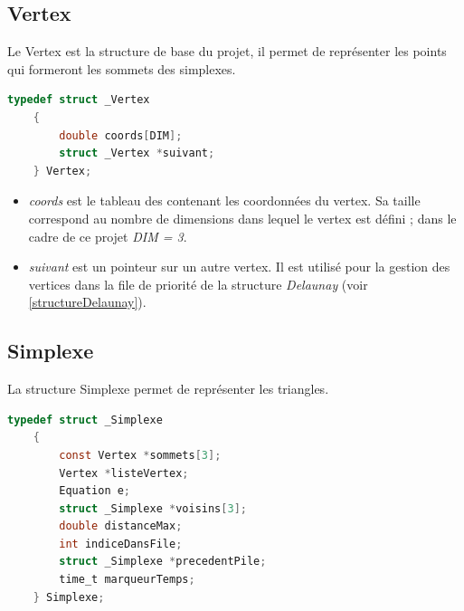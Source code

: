 \documentclass{article}
\begin{document}
    \subsection{Vertex}
    
        Le Vertex est la structure de base du projet, il permet de représenter les points qui formeront les sommets des simplexes.
    
    \begin{lstlisting}[caption={la structure Vertex},language=C,label=structvertex]
    typedef struct _Vertex
    {
        double coords[DIM]; 
        struct _Vertex *suivant;
    } Vertex;
    \end{lstlisting}
    
    \begin{itemize}
    \item \textit{coords} est le tableau des contenant les coordonnées du vertex. 
    Sa taille correspond au nombre de dimensions dans lequel le vertex est défini ; dans le cadre de ce projet \textit{DIM = 3}.
    \item \textit{suivant} est un pointeur sur un autre vertex. Il est utilisé pour la gestion des vertices dans la file de priorité de la structure \textit{Delaunay} (voir \ref{structureDelaunay}).
    \end{itemize}
    
    \subsection{Simplexe}
    
        La structure Simplexe permet de représenter les triangles.
     
    \begin{lstlisting}[caption={la structure Simplexe},language=C,label=structsimplexe]
    typedef struct _Simplexe
    {
        const Vertex *sommets[3];
        Vertex *listeVertex;
        Equation e;
        struct _Simplexe *voisins[3];
        double distanceMax;
        int indiceDansFile;
        struct _Simplexe *precedentPile;
        time_t marqueurTemps;
    } Simplexe;
    \end{lstlisting}
    
\end{document}
